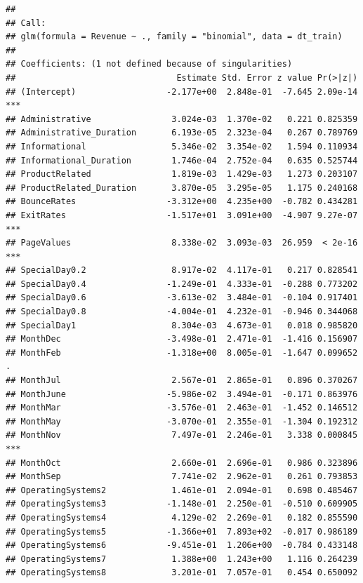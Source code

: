 \documentclass[
]{article}
\begin{document}
\begin{verbatim}
## 
## Call:
## glm(formula = Revenue ~ ., family = "binomial", data = dt_train)
## 
## Coefficients: (1 not defined because of singularities)
##                                Estimate Std. Error z value Pr(>|z|)    
## (Intercept)                  -2.177e+00  2.848e-01  -7.645 2.09e-14 ***
## Administrative                3.024e-03  1.370e-02   0.221 0.825359    
## Administrative_Duration       6.193e-05  2.323e-04   0.267 0.789769    
## Informational                 5.346e-02  3.354e-02   1.594 0.110934    
## Informational_Duration        1.746e-04  2.752e-04   0.635 0.525744    
## ProductRelated                1.819e-03  1.429e-03   1.273 0.203107    
## ProductRelated_Duration       3.870e-05  3.295e-05   1.175 0.240168    
## BounceRates                  -3.312e+00  4.235e+00  -0.782 0.434281    
## ExitRates                    -1.517e+01  3.091e+00  -4.907 9.27e-07 ***
## PageValues                    8.338e-02  3.093e-03  26.959  < 2e-16 ***
## SpecialDay0.2                 8.917e-02  4.117e-01   0.217 0.828541    
## SpecialDay0.4                -1.249e-01  4.333e-01  -0.288 0.773202    
## SpecialDay0.6                -3.613e-02  3.484e-01  -0.104 0.917401    
## SpecialDay0.8                -4.004e-01  4.232e-01  -0.946 0.344068    
## SpecialDay1                   8.304e-03  4.673e-01   0.018 0.985820    
## MonthDec                     -3.498e-01  2.471e-01  -1.416 0.156907    
## MonthFeb                     -1.318e+00  8.005e-01  -1.647 0.099652 .  
## MonthJul                      2.567e-01  2.865e-01   0.896 0.370267    
## MonthJune                    -5.986e-02  3.494e-01  -0.171 0.863976    
## MonthMar                     -3.576e-01  2.463e-01  -1.452 0.146512    
## MonthMay                     -3.070e-01  2.355e-01  -1.304 0.192312    
## MonthNov                      7.497e-01  2.246e-01   3.338 0.000845 ***
## MonthOct                      2.660e-01  2.696e-01   0.986 0.323896    
## MonthSep                      7.741e-02  2.962e-01   0.261 0.793853    
## OperatingSystems2             1.461e-01  2.094e-01   0.698 0.485467    
## OperatingSystems3            -1.148e-01  2.250e-01  -0.510 0.609905    
## OperatingSystems4             4.129e-02  2.269e-01   0.182 0.855590    
## OperatingSystems5            -1.366e+01  7.893e+02  -0.017 0.986189    
## OperatingSystems6            -9.451e-01  1.206e+00  -0.784 0.433148    
## OperatingSystems7             1.388e+00  1.243e+00   1.116 0.264239    
## OperatingSystems8             3.201e-01  7.057e-01   0.454 0.650092    

\end{verbatim}
\end{document}
